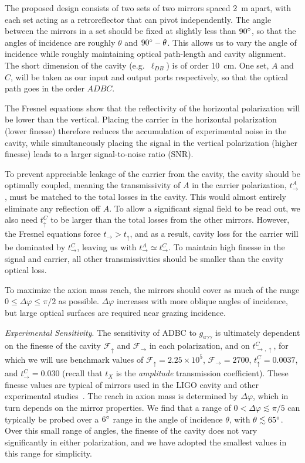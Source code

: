 \documentclass[aps,prd,nofootinbib,twocolumn,superscriptaddress,preprintnumbers,letterpaper, longbibliography]{revtex4-1}
\def\tc{t_\rightarrow}
\def\ts{t_\uparrow}
\begin{document}
The proposed design consists of two sets of two mirrors spaced \SI{2}{m} apart, with each set acting as a retroreflector that can pivot independently.  The angle between the mirrors in a set should be fixed at slightly less than $90\degree$, so that the angles of incidence are roughly $\theta$ and $90\degree - \theta$.  This allows us to vary the angle of incidence while roughly maintaining optical path-length and cavity alignment. The short dimension of the cavity (e.g.\ $\ell_{DB}$) is of order \SI{10}{cm}. One set, $A$ and $C$, will be taken as our input and output ports respectively, so that the optical path goes in the order $ADBC$. 

The Fresnel equations show that the reflectivity of the horizontal polarization will be lower than the vertical. Placing the carrier in the horizontal polarization (lower finesse) therefore reduces the accumulation of experimental noise in the cavity, while simultaneously placing the signal in the vertical polarization (higher finesse) leads to a larger signal-to-noise ratio (SNR). 

To prevent appreciable leakage of the carrier from the cavity, the cavity should be optimally coupled, meaning the transmissivity of $A$ in the carrier polarization, $\tc^A$, must be matched to the total losses in the cavity. This would almost entirely eliminate any reflection off $A$.  To allow a significant signal field to be read out, we also need $\ts^C$ to be larger than the total losses from the other mirrors. However, the Fresnel equations force $\tc > \ts$, and as a result, cavity loss for the carrier will be dominated by $\tc^C$, leaving us with $\tc^A \simeq \tc^C$.
To maintain high finesse in the signal and carrier, all other transmissivities should be smaller than the cavity optical loss.


To maximize the axion mass reach, the mirrors should cover as much of the range $0 \leq \Delta \varphi \leq \pi/2$ as possible. $\Delta \varphi$ increases with more oblique angles of incidence, but large optical surfaces are required near grazing incidence.

\vspace{0.2cm}
\textit{Experimental Sensitivity}. 
\label{experimentalsensitivity} The sensitivity of ADBC to $g_{a\gamma\gamma}$ is ultimately dependent on the finesse of the cavity $\mathcal{F}_\uparrow$ and $\mathcal{F}_\rightarrow$ in each polarization, and on $t_{\rightarrow,\uparrow}^C$, for which we will use benchmark values of $\mathcal{F}_\uparrow = 2.25 \times 10^5$, $\mathcal{F}_\rightarrow = 2700$, $t_\uparrow^C = 0.0037$, and $t_\rightarrow^C = 0.030$ (recall that $t_X$ is the \textit{amplitude} transmission coefficient). These finesse values are typical of mirrors used in the LIGO cavity and other experimental studies~\cite{Isogai:2013ic}. The reach in axion mass is determined by $\Delta \varphi$, which in turn depends on the mirror properties. We find that a range of  $0 < \Delta \varphi \lesssim \pi/5$ can typically be probed over a $6\degree$ range in the angle of incidence $\theta$, with $\theta \lesssim 65\degree$. Over this small range of angles, the finesse of the cavity does not vary significantly in either polarization, and we have adopted the smallest values in this range for simplicity. 
\end{document}
